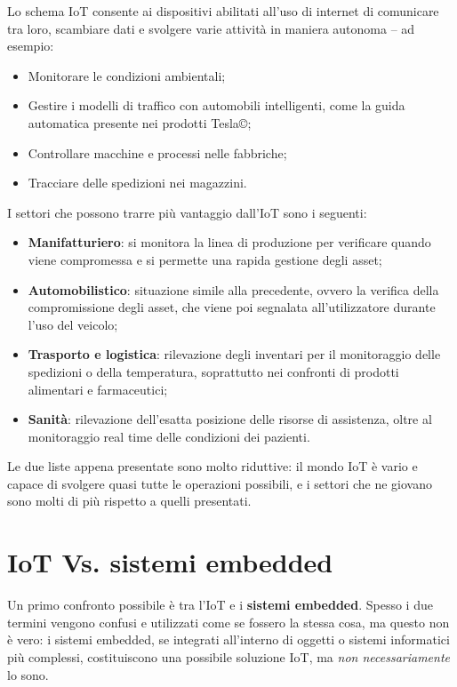 \noindent Lo schema IoT consente ai dispositivi abilitati all'uso di internet di comunicare tra loro, scambiare dati e svolgere varie attività in maniera autonoma – ad esempio:
\begin{itemize}
    \item Monitorare le condizioni ambientali;
    \item Gestire i modelli di traffico con automobili intelligenti, come la guida automatica presente nei prodotti Tesla\copyright;
    \item Controllare macchine e processi nelle fabbriche;
    \item Tracciare delle spedizioni nei magazzini.
\end{itemize}
I settori che possono trarre più vantaggio dall'IoT sono i seguenti\cite{iot-use}:
\begin{itemize}
    \item \textbf{Manifatturiero}: si monitora la linea di produzione per verificare quando viene compromessa e si permette una rapida gestione degli asset;
    \item \textbf{Automobilistico}: situazione simile alla precedente, ovvero la verifica della compromissione degli asset, che viene poi segnalata all'utilizzatore durante l'uso del veicolo; 
    \item \textbf{Trasporto e logistica}: rilevazione degli inventari per il monitoraggio delle spedizioni o della temperatura, soprattutto nei confronti di prodotti alimentari e farmaceutici;
    \item \textbf{Sanità}: rilevazione dell'esatta posizione delle risorse di assistenza, oltre al monitoraggio real time delle condizioni dei pazienti.
\end{itemize}
\noindent Le due liste appena presentate sono molto riduttive: il mondo IoT è vario e capace di svolgere quasi tutte le operazioni possibili, e i settori che ne giovano sono molti di più rispetto a quelli presentati.

\section{IoT Vs. sistemi embedded}

Un primo confronto possibile è tra l'IoT e i \textbf{sistemi embedded}. Spesso i due termini vengono confusi e utilizzati come se fossero la stessa cosa, ma questo non è vero: i sistemi embedded, se integrati all’interno di oggetti o sistemi informatici più complessi, costituiscono una possibile soluzione IoT, ma \textit{non necessariamente} lo sono. \\

